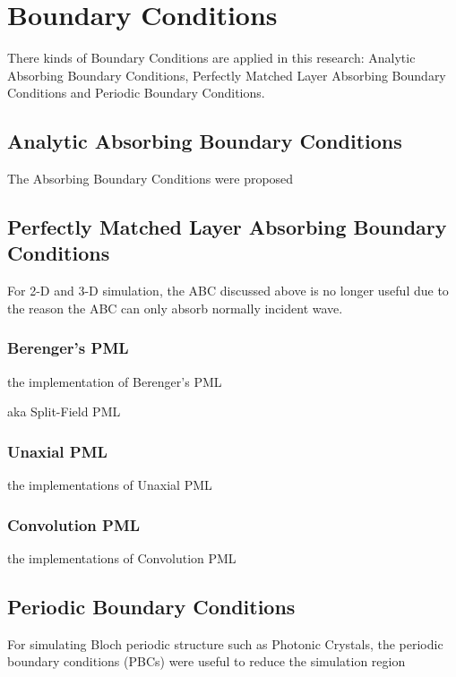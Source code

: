 \section{Boundary Conditions}
There kinds of Boundary Conditions are applied in this research: Analytic Absorbing Boundary Conditions, Perfectly
Matched Layer Absorbing Boundary Conditions and Periodic Boundary Conditions.
\subsection{Analytic Absorbing Boundary Conditions}

The Absorbing Boundary Conditions were proposed

\subsection{Perfectly Matched Layer Absorbing Boundary Conditions}

For 2-D and 3-D simulation, the ABC discussed above is no longer useful due to the reason the ABC can only absorb
normally incident wave.

\subsubsection{Berenger's PML}
the implementation of Berenger's PML

aka Split-Field PML
\subsubsection{Unaxial PML}
the implementations of Unaxial PML
\subsubsection{Convolution PML}
the implementations of Convolution PML

\subsection{Periodic Boundary Conditions}

For simulating Bloch periodic structure such as Photonic Crystals, the periodic boundary conditions (PBCs) were useful
to reduce the simulation region
